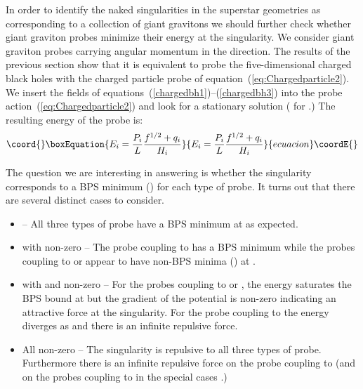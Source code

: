 \documentclass[a4paper,12pt]{article}
\begin{document}
In order to identify the naked singularities in the superstar geometries as corresponding to a collection of giant gravitons  we should further check whether giant graviton probes
minimize their energy at the singularity. We consider giant graviton probes
carrying angular momentum in the \coordHE{} direction. The results of the
previous section show that it is equivalent to probe the five-dimensional
charged black holes with the charged particle probe of
equation~(\ref{eq:Chargedparticle2}). We insert the fields of
equations~(\ref{chargedbh1})--(\ref{chargedbh3}) into the probe
action~(\ref{eq:Chargedparticle2}) and look for a stationary solution
(\coordHE{} for \coordHE{}.) The resulting energy of the probe is:
\begin{equation}\coord{}\boxEquation{
E_i = \frac{P_i}{L} \frac{f^{1/2} +q_i}{H_i}
}{
E_i = \frac{P_i}{L} \frac{f^{1/2} +q_i}{H_i}
}{ecuacion}\coordE{}\end{equation}

The question we are interesting in answering is whether the singularity \coordHE{}
corresponds to a BPS minimum (\coordHE{}) for each type of probe. It turns
out that there are several distinct cases to consider.
\begin{itemize}
\item
{}\coordHE{} -- All three types of probe have a BPS minimum at \coordHE{} as
expected.

\item
{}\coordHE{} with \coordHE{} non-zero -- The probe coupling to \coordHE{} has a BPS
minimum while the probes coupling to \coordHE{} or \coordHE{} appear to have non-BPS
minima (\coordHE{}) at \coordHE{}.

\item
{}\coordHE{} with \coordHE{} and \coordHE{} non-zero -- For the probes coupling to \coordHE{} or
\coordHE{}, the energy saturates the BPS bound at \coordHE{} but the gradient of the
potential is non-zero indicating an attractive force at the singularity. For
the probe coupling to \coordHE{} the energy diverges as \coordHE{} and there
is an infinite repulsive force. 

\item
All \coordHE{} non-zero -- The singularity is repulsive to all three types of
probe. Furthermore there is an infinite repulsive force on the probe
coupling to \coordHE{} (and on the probes coupling to \coordHE{} in the special cases
\coordHE{}.)
\end{itemize}
\end{document}
